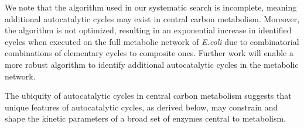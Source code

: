 \documentclass[a4page,notitlepage]{article}
\begin{document}
We note that the algorithm used in our systematic search is incomplete, meaning additional autocatalytic cycles may exist in central carbon metabolism.
Moreover, the algorithm is not optimized, resulting in an exponential increase in identified cycles when executed on the full metabolic network of \emph{E.coli} due to combinatorial combinations of elementary cycles to composite ones.
Further work will enable a more robust algorithm to identify additional autocatalytic cycles in the metabolic network.

The ubiquity of autocatalytic cycles in central carbon metabolism suggests that unique features of autocatalytic cycles, as derived below, may constrain and shape the kinetic parameters of a broad set of enzymes central to metabolism.

\begin{figure}[h!]
\end{figure}
\end{document}
